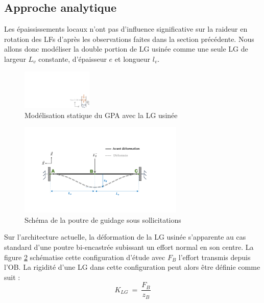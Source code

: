 	\subsection{Approche analytique}
	\label{subsec:3.2.1:Approche analytique LG}
Les épaississements locaux n'ont pas d'influence significative sur la raideur en rotation des LFs d'après les observations faites dans la section précédente. Nous allons donc modéliser la double portion de LG usinée comme une seule LG de largeur $L_v$ constante, d'épaisseur $e$ et longueur $l_v$. 
\begin{figure}[!htbp]
\begin{center}
    \captionsetup{justification=centering}
	\includegraphics[trim={23.5cm 0cm 0cm 12cm}, clip,width=0.3\textwidth]{../Chap3/Figure/KGPA_Kv2.pdf}
	\caption{Modélisation statique du GPA avec la LG usinée}
	\label{fig:KGPA_Kv}
\end{center}	
\end{figure}
\begin{figure}[!htbp]
\begin{center}
    \captionsetup{justification=centering}
	\includegraphics[trim={4cm 3cm 6.5cm 4.5cm},clip, width=0.7\textwidth]{../Chap3/Figure/Kv_modele2.pdf}
	\caption{Schéma de la poutre de guidage sous sollicitations}
	\label{fig:Kv_modele}
\end{center}	
\end{figure}

Sur l'architecture actuelle, la déformation de la LG usinée s'apparente au cas standard d'une poutre bi-encastrée subissant un effort normal en son centre. La figure \ref{fig:Kv_modele} schématise cette configuration d'étude avec $F_B$ l'effort transmis depuis l'OB. La rigidité d'une LG dans cette configuration peut alors être définie comme suit :
\begin{equation}
K_{LG}\ =\ \frac{F_B}{z_B}
\label{eq:def_Kv}
\end{equation}

